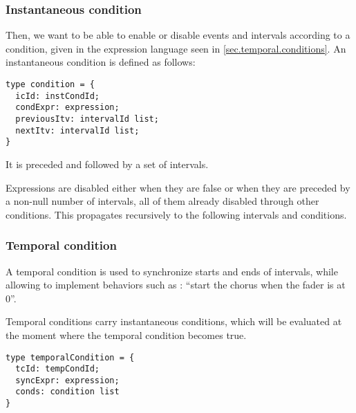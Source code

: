 \documentclass[applsci,article,submit,moreauthors,pdftex,10pt,a4paper]{mdpi}
\begin{document}
\subsubsection{Instantaneous condition}
Then, we want to be able to enable or disable events and intervals according to a condition, given in the expression language seen in \ref{sec.temporal.conditions}. An instantaneous condition is defined as follows: 

\begin{lstlisting}
type condition = {
  icId: instCondId;
  condExpr: expression;
  previousItv: intervalId list;
  nextItv: intervalId list;
}
\end{lstlisting}
It is preceded and followed by a set of intervals.

Expressions are disabled either when they are false or when they are preceded by a non-null number of intervals, all of them already disabled through other conditions. This propagates recursively to the following intervals and conditions. 

\subsubsection{Temporal condition}
A temporal condition is used to synchronize starts and ends of intervals, while allowing to implement behaviors such as : ``start the chorus when the fader is at 0''.

Temporal conditions carry instantaneous conditions, which will be evaluated at the moment where the temporal condition becomes true.


\begin{lstlisting}
type temporalCondition = {
  tcId: tempCondId;
  syncExpr: expression;
  conds: condition list
}
\end{lstlisting}
\end{document}
